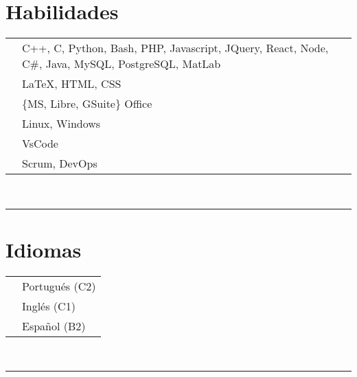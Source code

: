 \documentclass[oneside]{article}
\begin{document}
{\begin{minipage}[t][\textheight-2\fboxsep-2\fboxrule][t]{\dimexpr0.40\textwidth-2\fboxrule-2\fboxsep\relax}
        \section*{\large Habilidades}
        \begin{tabularx}{\textwidth}{cY}
            \faCode{}        & C++, C, Python, Bash, PHP, Javascript, JQuery, React, Node, C\#, Java, MySQL, PostgreSQL, MatLab \\ 
            \faPen*{}        & \LaTeX, HTML, CSS \\ 
            \faFont{}        & \{MS, Libre, GSuite\} Office \\ 
            \faCogs{}        & Linux, Windows \\ 
            \faLaptopCode{}  & VsCode \\ 
            \faToolbox{}     & Scrum, DevOps 
        \end{tabularx}
        \vspace{1pt} \\ 
        \rule{\linewidth}{0.4pt}
        \section*{\large Idiomas}
        \begin{tabular}{cl}
            \faLanguage{} & Portugués (C2) \\ 
            \faLanguage{} & Inglés (C1) \\ 
            \faLanguage{} & Español (B2) 
        \end{tabular}
        \vspace{.3cm} 
        \\ 
        \rule{\linewidth}{0.4pt} 
        \\

    \end{minipage}
}
\hfill
\end{document}
